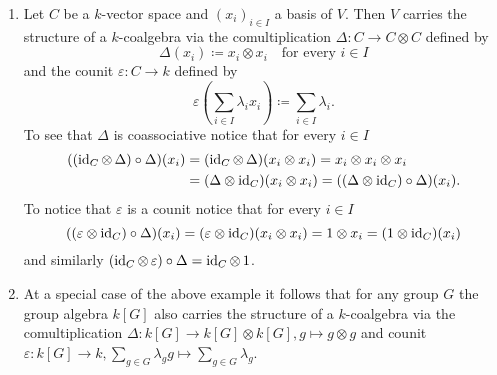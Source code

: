 \begin{expls}
 \begin{enumerate}[leftmargin=*]
  \item
   Let $C$ be a $k$-vector space and $(x_i)_{i \in I}$ a basis of $V$. Then $V$ carries the structure of a $k$-coalgebra via the comultiplication $\Delta \colon C \to C \otimes C$ defined by
   \[
    \Delta(x_i) \coloneqq x_i \otimes x_i \quad \text{for every $i \in I$}
   \]
   and the counit $\varepsilon \colon C \to k$ defined by
   \[
    \varepsilon\left( \sum_{i \in I} \lambda_i x_i \right) \coloneqq \sum_{i \in I} \lambda_i.
   \]
   To see that $\Delta$ is coassociative notice that for every $i \in I$
   \begin{align*}
     ((\operatorname{id}_C \otimes\, \Delta) \circ \Delta)(x_i)
     &= (\operatorname{id}_C \otimes\, \Delta)(x_i \otimes x_i)
     = x_i \otimes x_i \otimes x_i \\
     &= (\Delta \otimes \operatorname{id}_C)(x_i \otimes x_i)
     = ((\Delta \otimes \operatorname{id}_C) \circ \Delta)(x_i).
   \end{align*}
   To notice that $\varepsilon$ is a counit notice that for every $i \in I$
   \[
     ((\varepsilon \otimes \operatorname{id}_C) \circ \Delta)(x_i)
     = (\varepsilon \otimes \operatorname{id}_C)(x_i \otimes x_i)
     = 1 \otimes x_i
     = (1 \otimes \operatorname{id}_C)(x_i)
   \]
   and similarly $(\operatorname{id}_C \otimes\, \varepsilon) \circ \Delta = \operatorname{id}_C \otimes\, 1$.
   
  \item
   At a special case of the above example it follows that for any group $G$ the group algebra $k[G]$ also carries the structure of a $k$-coalgebra via the comultiplication $\Delta \colon k[G] \to k[G] \otimes k[G], g \mapsto g \otimes g$ and counit $\varepsilon \colon k[G] \to k, \sum_{g \in G} \lambda_g g \mapsto \sum_{g \in G} \lambda_g$.
 \end{enumerate}
\end{expls}

